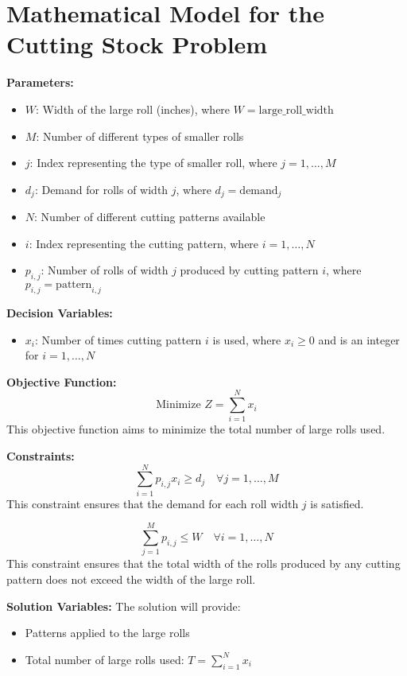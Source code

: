 \documentclass{article}
\begin{document}
\section*{Mathematical Model for the Cutting Stock Problem}

\textbf{Parameters:}
\begin{itemize}
    \item $W$: Width of the large roll (inches), where $W = \text{large\_roll\_width}$
    \item $M$: Number of different types of smaller rolls
    \item $j$: Index representing the type of smaller roll, where $j = 1, \ldots, M$
    \item $d_j$: Demand for rolls of width $j$, where $d_j = \text{demand}_j$
    \item $N$: Number of different cutting patterns available
    \item $i$: Index representing the cutting pattern, where $i = 1, \ldots, N$
    \item $p_{i,j}$: Number of rolls of width $j$ produced by cutting pattern $i$, where $p_{i,j} = \text{pattern}_{i,j}$
\end{itemize}

\textbf{Decision Variables:}
\begin{itemize}
    \item $x_i$: Number of times cutting pattern $i$ is used, where $x_i \geq 0$ and is an integer for $i = 1, \ldots, N$
\end{itemize}

\textbf{Objective Function:}
\begin{equation}
\text{Minimize } Z = \sum_{i=1}^{N} x_i
\end{equation}
This objective function aims to minimize the total number of large rolls used.

\textbf{Constraints:}
\begin{equation}
\sum_{i=1}^{N} p_{i,j} x_i \geq d_j \quad \forall j = 1, \ldots, M
\end{equation}
This constraint ensures that the demand for each roll width $j$ is satisfied.

\begin{equation}
\sum_{j=1}^{M} p_{i,j} \leq W \quad \forall i = 1, \ldots, N
\end{equation}
This constraint ensures that the total width of the rolls produced by any cutting pattern does not exceed the width of the large roll.

\textbf{Solution Variables:}
The solution will provide:
\begin{itemize}
    \item Patterns applied to the large rolls
    \item Total number of large rolls used: $T = \sum_{i=1}^{N} x_i$
\end{itemize}
\end{document}
